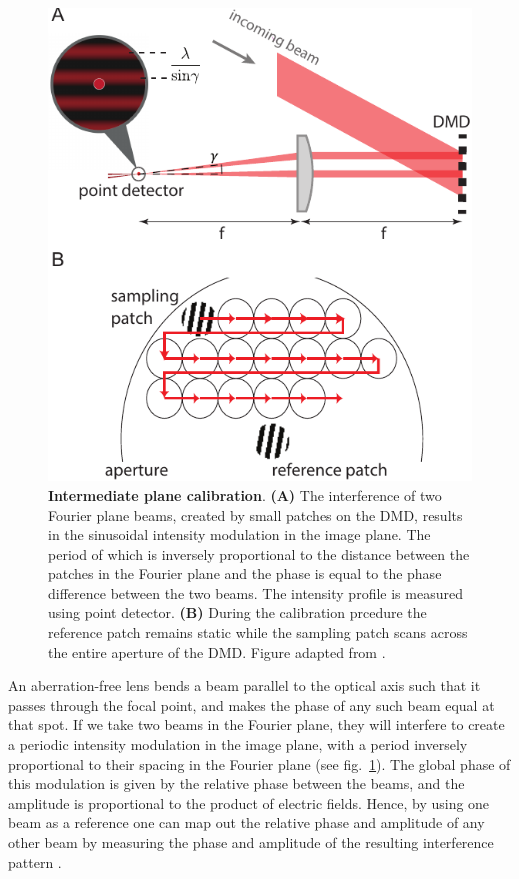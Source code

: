 \begin{figure}[t]
	\centering
	\includegraphics[scale=1]{figures/DMD_ipcal.pdf}
	\caption{{\bf Intermediate plane calibration}. {\bf (A)} The interference of two Fourier plane beams, created by small patches on the DMD, results in the sinusoidal intensity modulation in the image plane. The period of which is inversely proportional to the distance between the patches in the Fourier plane and the phase is equal to the phase difference between the two beams. The intensity profile is measured using point detector. {\bf (B)} During the calibration prcedure the reference patch remains static while the sampling patch scans across the entire aperture of the DMD. Figure adapted from \cite{Zupancic2016}.}
	\label{fig:DMD_cal_scheam}
\end{figure}

An aberration-free lens bends a beam parallel to the optical axis such that it passes through the focal point, and makes the phase of any such beam equal at that spot. If we take two beams in the Fourier plane, they will interfere to create a periodic intensity modulation in the image plane, with a period inversely proportional to their spacing in the Fourier plane (see fig.~\ref{fig:DMD_cal_scheam}). The global phase of this modulation is given by the relative phase between the beams, and the amplitude is proportional to the product of electric fields. Hence, by using one beam as a reference one can map out the relative phase and amplitude of any other beam by measuring the phase and amplitude of the resulting interference pattern \cite{Zupancic2016}.

